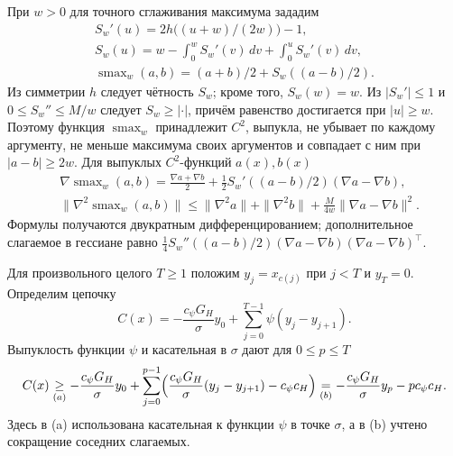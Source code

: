 При $w>0$ для точного сглаживания максимума зададим
\begin{gather*}
 S_w'(u)=2h\bigl((u+w)/(2w)\bigr)-1,\\
 S_w(u)=w-\int_0^w S_w'(v)\,dv+\int_0^u S_w'(v)\,dv,\\
 \operatorname{smax}_w(a,b)=(a+b)/2+S_w((a-b)/2).
\end{gather*}
Из симметрии $h$ следует чётность $S_w$; кроме того, $S_w(w)=w$.
Из $|S_w'|\le1$ и $0\le S_w''\le M/w$ следует
$S_w\ge|\cdot|$, причём равенство достигается при $|u|\ge w$.
Поэтому функция $\operatorname{smax}_w$ принадлежит $C^2$, выпукла, не убывает по каждому
аргументу, не меньше максимума своих аргументов и совпадает с ним при
$|a-b|\ge2w$. Для выпуклых $C^2$-функций $a(x),b(x)$
\begin{equation}\label{eq:lower-smax-hessian}
 \begin{aligned}
 &\nabla\operatorname{smax}_w(a,b)=\frac{\nabla a+\nabla b}{2}
 +\frac12S_w'((a-b)/2)(\nabla a-\nabla b),\\
 &\|\nabla^2\operatorname{smax}_w(a,b)\|\le\|\nabla^2a\|+\|\nabla^2b\|
 +\frac{M}{4w}\|\nabla a-\nabla b\|^2.
 \end{aligned}
\end{equation}
Формулы получаются двукратным дифференцированием; дополнительное слагаемое
в гессиане равно
$\frac14S_w''((a-b)/2)(\nabla a-\nabla b)(\nabla a-\nabla b)^\top$.

Для произвольного целого $T\ge1$ положим $y_j=x_{c(j)}$ при $j<T$
и $y_T=0$. Определим цепочку
\begin{equation}
\label{eq:lower-chain}
 C(x)=-\frac{c_{\psi}G_H}{\sigma}y_0+\sum_{j=0}^{T-1}\psi(y_j-y_{j+1}).
\end{equation}
Выпуклость функции $\psi$ и касательная в $\sigma$ дают для $0\le p\le T$
\begin{equation}\label{eq:lower-fenchel}
 C(x) \by{\ge}{(a)}
 -\frac{c_{\psi}G_H}{\sigma}y_0+\sum_{j=0}^{p-1}
 \Bigl(\frac{c_{\psi}G_H}{\sigma}(y_j-y_{j+1})-c_{\psi}c_H\Bigr) \by{=}{(b)}-\frac{c_{\psi}G_H}{\sigma}y_p-pc_{\psi}c_H.
\end{equation}
Здесь в (a) использована касательная к функции $\psi$ в точке $\sigma$, а в (b) учтено сокращение соседних слагаемых.

